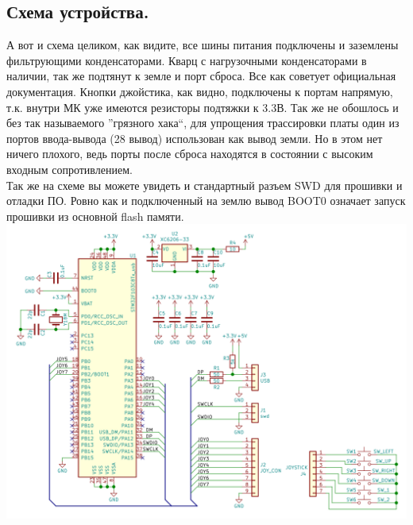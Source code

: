 \documentclass[12pt,a4paper]{article}
\begin{document}
\subsection{Схема устройства.}
    А вот и схема целиком, как видите, все шины питания подключены и
    заземлены фильтрующими конденсаторами. Кварц с нагрузочными конденсаторами
    в наличии, так же подтянут к земле и порт сброса. Все как советует официальная документация.
    Кнопки джойстика, как видно, подключены к портам напрямую, т.к. внутри МК
    уже имеются резисторы подтяжки к 3.3В. Так же не обошлось и без так
    называемого ''грязного хака``, для упрощения трассировки платы один из
    портов ввода-вывода (28 вывод) использован как вывод земли. Но в этом нет ничего плохого,
    ведь порты после сброса находятся в состоянии с высоким входным
    сопротивлением.\\
    Так же на схеме вы можете увидеть и стандартный разъем SWD для прошивки
    и отладки ПО. Ровно как и подключенный на землю вывод BOOT0 означает
    запуск прошивки из основной flash памяти.\\
\includegraphics[width=15cm]{sch.png}\\

\newpage
\end{document}
